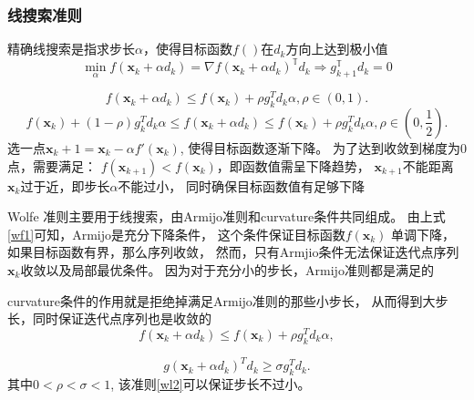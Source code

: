 \subsubsection{线搜索准则}

\begin{theorem}[精确线搜索准则]
    精确线搜索是指求步长$\alpha$，使得目标函数$f()$在$d_k$方向上达到极小值
    \begin{equation}
        \min_\alpha f(\bm{x}_k+\alpha d_k) = \nabla f(\bm{x}_k+\alpha d_k)^{\mathbb{T}}d_k \Rightarrow g_{k+1}^{\mathbb{T}}d_k=0
    \end{equation}
\end{theorem}

\begin{definition}\cite{1980Curvilinear}\label{wf1}
    \begin{equation}
        f(\bm{x}_k+\alpha d_k) \leq f(\bm{x}_k) + \rho g_k^Td_k\alpha, \rho\in(0,1).
    \end{equation}
    \begin{equation}
        f(\bm{x}_k) + (1 - \rho) g_k^Td_k\alpha \leq 
        f(\bm{x}_k+\alpha d_k) \leq 
        f(\bm{x}_k) + \rho g_k^Td_k\alpha, 
        \rho\in(0,\displaystyle\frac{1}{2}).
    \end{equation}
    选一点$\bm{x}_k+1=\bm{x}_k−\alpha f′(\bm{x}_k)$, 
    使得目标函数逐渐下降。
    为了达到收敛到梯度为0点，需要满足：
    $f(\bm{x}_{k+1})<f(\bm{x}_k)$，即函数值需呈下降趋势，
    $\bm{x}_{k+1}$不能距离$\bm{x}_k$过于近，即步长$\alpha$不能过小，
    同时确保目标函数值有足够下降
\end{definition}

\begin{definition}[Wolfe准则]
    Wolfe 准则主要用于线搜索，由Armijo准则和curvature条件共同组成。
    由上式\ref{wf1}可知，Armijo是充分下降条件，
    这个条件保证目标函数$f(\bm{x}_k)$ 单调下降，
    如果目标函数有界，那么序列收敛，
    然而，只有Armjio条件无法保证迭代点序列$\bm{x}_k$收敛以及局部最优条件。
    因为对于充分小的步长，Armijo准则都是满足的
    
    curvature条件的作用就是拒绝掉满足Armijo准则的那些小步长，
    从而得到大步长，同时保证迭代点序列也是收敛的
    \begin{equation}
        f(\bm{x}_k+\alpha d_k) \leq f(\bm{x}_k) + \rho g_k^Td_k\alpha,
    \end{equation}
        
    \begin{equation}\label{wl2}
        g(\bm{x}_k+\alpha d_k)^Td_k \geq \sigma g_k^Td_k.
    \end{equation}
    其中$0 < \rho < \sigma < 1$, 该准则\ref{wl2}可以保证步长不过小。
\end{definition}

